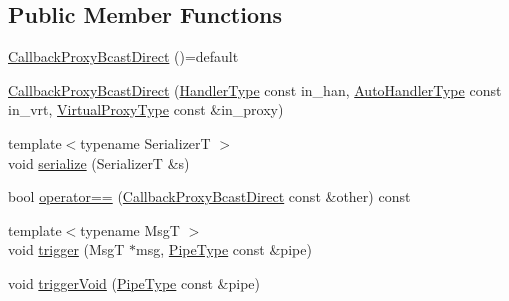\subsection*{Public Member Functions}
\begin{DoxyCompactItemize}
\item 
\hyperlink{structvt_1_1pipe_1_1callback_1_1_callback_proxy_bcast_direct_a4e1553252066be693d9471399a099d57}{Callback\+Proxy\+Bcast\+Direct} ()=default
\item 
\hyperlink{structvt_1_1pipe_1_1callback_1_1_callback_proxy_bcast_direct_ab3a878cbc7201df43d33dd967d9ca823}{Callback\+Proxy\+Bcast\+Direct} (\hyperlink{namespacevt_af64846b57dfcaf104da3ef6967917573}{Handler\+Type} const in\+\_\+han, \hyperlink{structvt_1_1pipe_1_1callback_1_1_callback_proxy_bcast_direct_a543cd86434430bd048952534f4fbc128}{Auto\+Handler\+Type} const in\+\_\+vrt, \hyperlink{namespacevt_a1b417dd5d684f045bb58a0ede70045ac}{Virtual\+Proxy\+Type} const \&in\+\_\+proxy)
\item 
{\footnotesize template$<$typename SerializerT $>$ }\\void \hyperlink{structvt_1_1pipe_1_1callback_1_1_callback_proxy_bcast_direct_aaa0cd50e42f5585d82425c703e0383b1}{serialize} (SerializerT \&s)
\item 
bool \hyperlink{structvt_1_1pipe_1_1callback_1_1_callback_proxy_bcast_direct_a47efba43a917e20ecdbaa513e502272b}{operator==} (\hyperlink{structvt_1_1pipe_1_1callback_1_1_callback_proxy_bcast_direct}{Callback\+Proxy\+Bcast\+Direct} const \&other) const
\item 
{\footnotesize template$<$typename MsgT $>$ }\\void \hyperlink{structvt_1_1pipe_1_1callback_1_1_callback_proxy_bcast_direct_a8d2fcd9c80915400e96c9094ba26c9d4}{trigger} (MsgT $\ast$msg, \hyperlink{namespacevt_ac9852acda74d1896f48f406cd72c7bd3}{Pipe\+Type} const \&pipe)
\item 
void \hyperlink{structvt_1_1pipe_1_1callback_1_1_callback_proxy_bcast_direct_aaa09586f609c545e3c0bff45dd5b6cbe}{trigger\+Void} (\hyperlink{namespacevt_ac9852acda74d1896f48f406cd72c7bd3}{Pipe\+Type} const \&pipe)
\end{DoxyCompactItemize}

